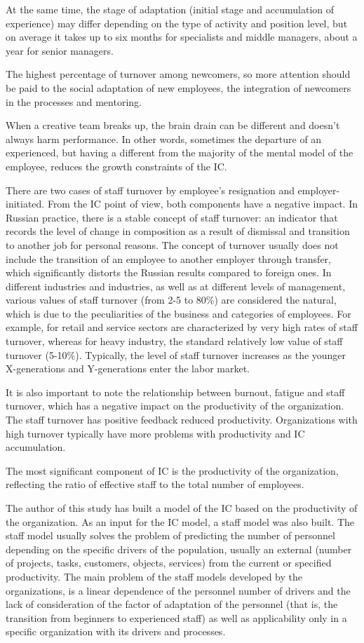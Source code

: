 \documentclass[12pt]{report}
\theoremstyle{definition}
\begin{document}
At the same time, the stage of adaptation (initial stage and accumulation of experience) may differ depending on the type of activity and position level, but on average it takes up to six months for specialists and middle managers, about a year for senior managers.

The highest percentage of turnover among newcomers, so more attention should be paid to the social adaptation of new employees, the integration of newcomers in the processes and mentoring.

When a creative team breaks up, the brain drain can be different and doesn't always harm performance. 
In other words, sometimes the departure of an experienced, but having a different from the majority of the mental model of the employee, reduces the growth constraints of the IC.

There are two cases of staff turnover by employee's resignation and employer-initiated. 
From the IC point of view, both components have a negative impact. 
In Russian practice, there is a stable concept of staff turnover: an indicator that records the level of change in composition as a result of dismissal and transition to another job for personal reasons. 
The concept of turnover usually does not include the transition of an employee to another employer through transfer, which significantly distorts the Russian results compared to foreign ones. 
In different industries and industries, as well as at different levels of management, various values of staff turnover (from 2-5 to 80\%) are considered the natural, which is due to the peculiarities of the business and categories of employees. 
For example, for retail and service sectors are characterized by very high rates of staff turnover, whereas for heavy industry, the standard relatively low value of staff turnover (5-10\%).
Typically, the level of staff turnover increases as the younger X-generations and Y-generations enter the labor market.

It is also important to note the relationship between burnout, fatigue and staff turnover, which has a negative impact on the productivity of the organization.
The staff turnover has positive feedback reduced productivity. 
Organizations with high turnover typically have more problems with productivity and IC accumulation. 

The most significant component of IC is the productivity of the organization, reflecting the ratio of effective staff to the total number of employees.  

The author of this study has built a model of the IC based on the productivity of the organization. 
As an input for the IC model, a staff model was also built.
The staff model usually solves the problem of predicting the number of personnel depending on the specific drivers of the population, usually an external (number of projects, tasks, customers, objects, services) from the current or specified productivity.
The main problem of the staff models developed by the organizations, is a linear dependence of the personnel number of drivers and the lack of consideration of the factor of adaptation of the personnel (that is, the transition from beginners to experienced staff) as well as applicability only in a specific organization with its drivers and processes.
\end{document}
